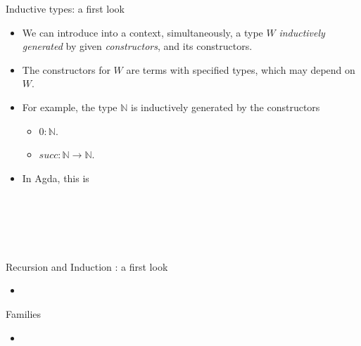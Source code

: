\documentclass[10 pt., handout]{beamer}
\theoremstyle{plain}
\theoremstyle{remark}
\newcommand{\N}{\mathbb{N}}
\begin{document}
\begin{frame}{Inductive types: a first look}

\begin{itemize}

\item We can introduce into a context, simultaneously, a type $W$ \emph{inductively generated} by given \emph{constructors}, and its constructors.

\item The constructors for $W$ are terms with specified types, which may depend on $W$.

\item For example, the type $\N$ is inductively generated by the constructors
\begin{itemize}
\item $0: \N$.
\item $succ : \N \to \N$.
\end{itemize}

\item In Agda, this is

\begin{code}\>\<%
\\
\>  \AgdaSymbol{:}  \<%
\\
\>[0]\<[2]%
\>[2] \AgdaSymbol{:} \<%
\\
\>[0]\<[2]%
\>[2] \AgdaSymbol{:}   \<%
\\
\>\<\end{code}

\end{itemize}

\end{frame}



\begin{frame}{Recursion and Induction : a first look}

\begin{itemize}

  \item


\end{itemize}

\end{frame}



\begin{frame}{Families}

\begin{itemize}

  \item


\end{itemize}

\end{frame}
\end{document}
